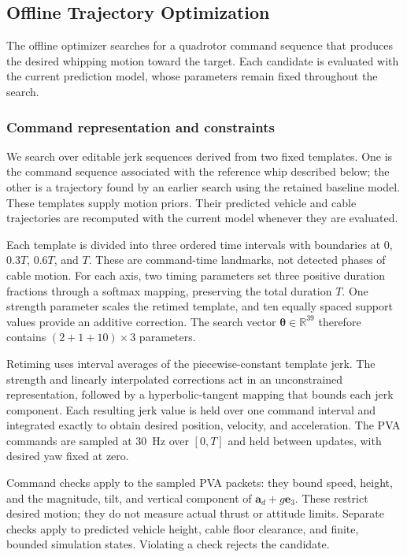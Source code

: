 \documentclass[letterpaper, 10 pt, conference]{ieeeconf}
\begin{document}
\subsection{Offline Trajectory Optimization}
\label{subsec:offline_planning}

The offline optimizer searches for a quadrotor command sequence
that produces the desired whipping motion toward the target.
Each candidate is evaluated with the current prediction model,
whose parameters remain fixed throughout the search.

\subsubsection{Command representation and constraints}
We search over editable jerk sequences derived from two fixed
templates. One is the command sequence associated with the reference
whip described below; the other is a trajectory found by an earlier
search using the retained baseline model. These templates supply
motion priors. Their predicted vehicle and cable trajectories are
recomputed with the current model whenever they are evaluated.

Each template is divided into three ordered time intervals with
boundaries at $0$, $0.3T$, $0.6T$, and $T$. These are command-time
landmarks, not detected phases of cable motion. For each axis,
two timing parameters set three positive duration fractions through
a softmax mapping, preserving the total duration $T$. One strength
parameter scales the retimed template, and ten equally spaced
support values provide an additive correction. The search vector
$\boldsymbol\theta\in\mathbb{R}^{39}$ therefore contains
$(2+1+10)\times3$ parameters.

Retiming uses interval averages of the piecewise-constant template
jerk. The strength and linearly interpolated corrections act in
an unconstrained representation, followed by a hyperbolic-tangent
mapping that bounds each jerk component. Each resulting jerk
value is held over one command interval and integrated exactly
to obtain desired position, velocity, and acceleration.
The PVA commands are sampled at 30~Hz over $[0,T]$ and held
between updates, with desired yaw fixed at zero.

Command checks apply to the sampled PVA packets: they bound
speed, height, and the magnitude, tilt, and vertical component
of $\mathbf a_d+g\mathbf e_3$. These restrict desired motion;
they do not measure actual thrust or attitude limits.
Separate checks apply to predicted vehicle height, cable floor
clearance, and finite, bounded simulation states. Violating
a check rejects the candidate.
\end{document}
